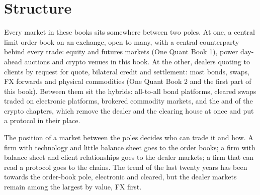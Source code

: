 \begin{omfigure}

\label{fig:m3:a-map-of-all-markets:sizes}
\end{omfigure}

\section{Structure}

Every market in these books sits somewhere between two poles. At one, a central limit order book on an exchange, open to many, with a central
counterparty behind every trade: equity and futures markets (One Quant Book 1), power day-ahead auctions and crypto venues in this book. At the other,
dealers quoting to clients by request for quote, bilateral credit and settlement: most bonds, swaps, FX forwards and physical commodities (One Quant
Book 2 and the first part of this book). Between them sit the hybrids: all-to-all bond platforms, cleared swaps traded on electronic platforms,
brokered commodity markets, and the  and  of the crypto chapters, which remove the dealer and the
clearing house at once and put a protocol in their place.

The position of a market between the poles decides who can trade it and how. A firm with technology and little balance sheet goes to the order books;
a firm with balance sheet and client relationships goes to the dealer markets; a firm that can read a protocol goes to the chains. The trend of the last
twenty years has been towards the order-book pole, electronic and cleared, but the dealer markets remain among the largest by value, FX first.

